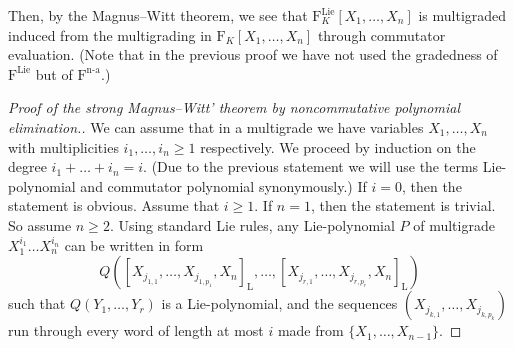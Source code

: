 \documentclass[11pt,a4paper]{amsart}
\DeclareMathOperator{\nonass}{n-a}
\DeclareMathOperator{\Lie}{Lie}
\theoremstyle{definition}
\theoremstyle{plain}
\begin{document}
Then, by the Magnus--Witt theorem, we see that $\mathrm F^{\Lie}_K[X_1,\ldots,X_n]$
 is multigraded induced from the multigrading in $\mathrm F_K[X_1,\ldots,X_n]$ through commutator evaluation.
(Note that in the previous proof we have not used the gradedness of $\mathrm F^{\Lie}$ but  of $\mathrm F^{\nonass}$.)

\begin{proof}[Proof of the strong Magnus--Witt' theorem  by noncommutative polynomial elimination.]
We can assume that in a multigrade we have variables $X_1,\ldots,X_n$  with multiplicities $i_1,\ldots,i_n\geq1$ respectively.
We proceed by induction on the degree $i_1+\ldots+i_n=i$.
(Due to the previous statement we will use the terms Lie-polynomial and commutator polynomial  synonymously.)
If $i=0$, then the statement is obvious.
Assume that $i\geq1$.
If $n=1$, then the statement is trivial.
So assume $n\geq2$.
Using standard Lie rules, any Lie-polynomial $P$ of multigrade $X_1^{i_1}\ldots X_n^{i_n}$ can be written in form
\[Q( [X_{j_{1,1}}, \ldots,X_{j_{1,p_1}} ,X_n]_{\mathrm L}, \ldots , [X_{j_{r,1}}, \ldots,X_{j_{r,p_r}} ,X_n]_{\mathrm L} )\]
 such that $Q(Y_1,\ldots,Y_r)$ is a Lie-polynomial, and the
 sequences $(X_{j_{k,1}}, \ldots,X_{j_{k,p_k}}) $
 run through every word of length at most $i$ made from $\{X_1,\ldots,X_{n-1}\}$.


\end{proof}
\end{document}
